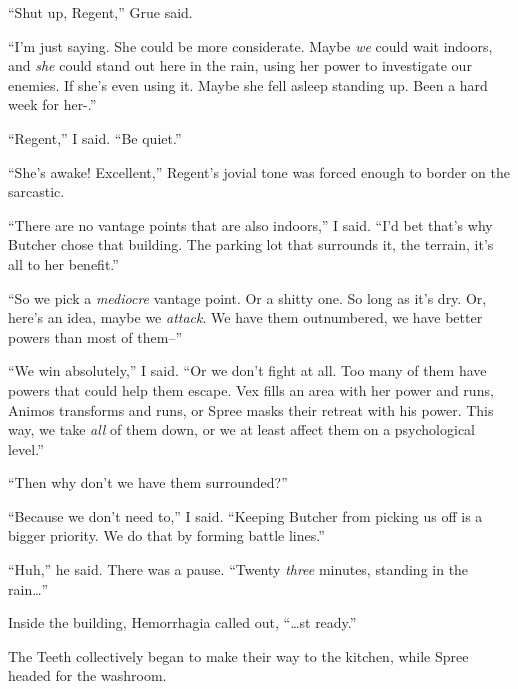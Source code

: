 ``Shut up, Regent,'' Grue said.



``I'm just saying.  She could be more considerate.  Maybe \emph{we} could wait indoors, and \emph{she} could stand out here in the rain, using her power to investigate our enemies.  If she's even using it.  Maybe she fell asleep standing up.  Been a hard week for her-.''



``Regent,'' I said.  ``Be quiet.''



``She's awake!  Excellent,'' Regent's jovial tone was forced enough to border on the sarcastic.



``There are no vantage points that are also indoors,'' I said.  ``I'd bet that's why Butcher chose that building.  The parking lot that surrounds it, the terrain, it's all to her benefit.''



``So we pick a \emph{mediocre} vantage point.  Or a shitty one.  So long as it's dry.  Or, here's an idea, maybe we \emph{attack}.  We have them outnumbered, we have better powers than most of them--''



``We win absolutely,'' I said.  ``Or we don't fight at all.  Too many of them have powers that could help them escape.  Vex fills an area with her power and runs, Animos transforms and runs, or Spree masks their retreat with his power.  This way, we take\emph{ }\emph{all} of them down, or we at least affect them on a psychological level.''



``Then why don't we have them surrounded?''



``Because we don't need to,'' I said.  ``Keeping Butcher from picking us off is a bigger priority.  We do that by forming battle lines.''



``Huh,'' he said.  There was a pause.  ``Twenty \emph{three} minutes, standing in the rain\ldots''



Inside the building, Hemorrhagia called out, ``\ldots{}st ready.''



The Teeth collectively began to make their way to the kitchen, while Spree headed for the washroom.




